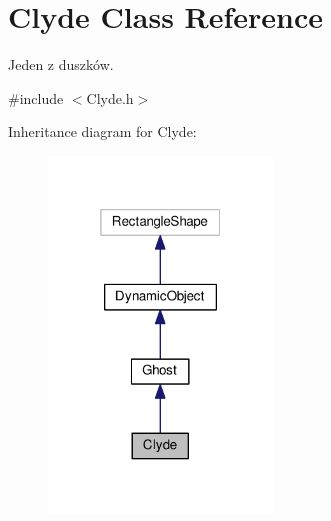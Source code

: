 \hypertarget{classClyde}{}\section{Clyde Class Reference}
\label{classClyde}


Jeden z duszków.  




{\ttfamily \#include $<$Clyde.\+h$>$}



Inheritance diagram for Clyde\+:\nopagebreak
\begin{figure}[H]
\begin{center}
\leavevmode
\includegraphics[width=169pt]{classClyde__inherit__graph}
\end{center}
\end{figure}


